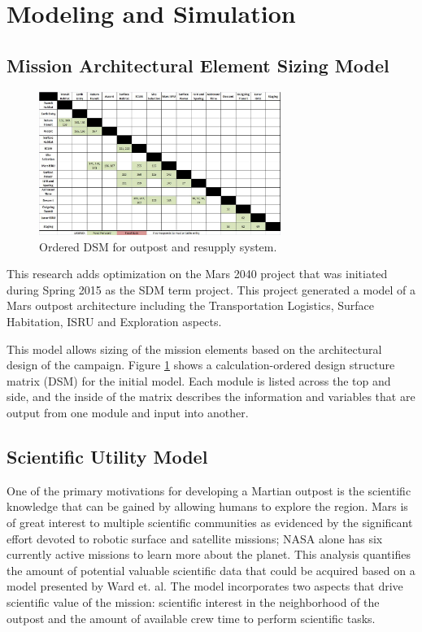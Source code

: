 \documentclass[]{aiaa-pretty}
\begin{document}
\section{Modeling and Simulation}
\label{sec:model}


\subsection{Mission Architectural Element Sizing Model}
\begin{figure}[h!]
	\centering
	\includegraphics[width=0.7\textwidth]{OrderedDSM}
	\caption{Ordered DSM for outpost and resupply system.}
	\label{fig:orderedDSM}
\end{figure}
This research adds optimization on the Mars 2040 project that was initiated during Spring 2015 as the SDM term project.  This project generated a model of a Mars outpost architecture including the Transportation Logistics, Surface Habitation, ISRU and Exploration aspects. 

This model allows sizing of the mission elements based on the architectural design of the campaign. Figure \ref{fig:orderedDSM} shows a calculation-ordered design structure matrix (DSM) for the initial model. Each module is listed across the top and side, and the inside of the matrix describes the information and variables that are output from one module and input into another.


\subsection{Scientific Utility Model}

One of the primary motivations for developing a Martian outpost is the scientific knowledge that can be gained by allowing humans to explore the region. Mars is of great interest to multiple scientific communities as evidenced by the significant effort devoted to robotic surface and satellite missions; NASA alone has six currently active missions to learn more about the planet. \cite{nasa2016mars} This analysis quantifies the amount of potential valuable scientific data that could be acquired based on a model presented by Ward et. al. \cite{ward2015} The model incorporates two aspects that drive scientific value of the mission: scientific interest in the neighborhood of the outpost and the amount of available crew time to perform scientific tasks.
\end{document}

